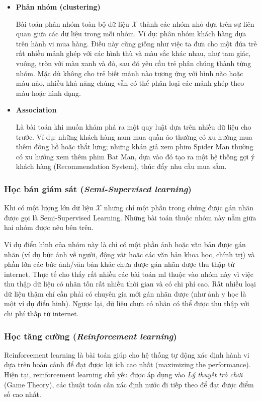 \documentclass[../main-report.tex]{subfiles}
\begin{document}
\begin{itemize}
\item \textbf{Phân nhóm (clustering)}

Bài toán phân nhóm toàn bộ dữ liệu \(\mathcal{X}\) thành các nhóm nhỏ dựa trên sự liên quan giữa các dữ liệu trong mỗi nhóm. Ví dụ: phân nhóm khách hàng dựa trên hành vi mua hàng. Điều này cũng giống như việc ta đưa cho một đứa trẻ rất nhiều mảnh ghép với các hình thù và màu sắc khác nhau, như tam giác, vuông, tròn với màu xanh và đỏ, sau đó yêu cầu trẻ phân chúng thành từng nhóm. Mặc dù không cho trẻ biết mảnh nào tương ứng với hình nào hoặc màu nào, nhiều khả năng chúng vẫn có thể phân loại các mảnh ghép theo màu hoặc hình dạng.

\item \textbf{Association}

Là bài toán khi muốn khám phá ra một quy luật dựa trên nhiều dữ liệu cho trước. Ví dụ: những khách hàng nam mua quần áo thường có xu hướng mua thêm đồng hồ hoặc thắt lưng; những khán giả xem phim Spider Man thường có xu hướng xem thêm phim Bat Man, dựa vào đó tạo ra một hệ thống gợi ý khách hàng (Recommendation System), thúc đẩy nhu cầu mua sắm.
\end{itemize}

\subsubsection{Học bán giám sát (\emph{Semi-Supervised learning})}
Khi có một lượng lớn dữ liệu \(\mathcal{X}\) nhưng chỉ một phần trong chúng được gán nhãn được gọi là Semi-Supervised Learning. Những bài toán thuộc nhóm này nằm giữa hai nhóm được nêu bên trên.

Ví dụ điển hình của nhóm này là chỉ có một phần ảnh hoặc văn bản được gán nhãn (ví dụ bức ảnh về người, động vật hoặc các văn bản khoa học, chính trị) và phần lớn các bức ảnh/văn bản khác chưa được gán nhãn được thu thập từ internet. Thực tế cho thấy rất nhiều các bài toán \gls{ml} thuộc vào nhóm này vì việc thu thập dữ liệu có nhãn tốn rất nhiều thời gian và có chi phí cao. Rất nhiều loại dữ liệu thậm chí cần phải có chuyên gia mới gán nhãn được (như ảnh y học là một ví dụ điển hinh). Ngược lại, dữ liệu chưa có nhãn có thể được thu thập với chi phí thấp từ internet.

\subsubsection{Học tăng cường (\emph{Reinforcement learning})}
Reinforcement learning là bài toán giúp cho hệ thống tự động xác định hành vi dựa trên hoàn cảnh để đạt được lợi ích cao nhất (maximizing the performance). Hiện tại, reinforcement learning chủ yếu được áp dụng vào \emph{Lý thuyết trò chơi} (Game Theory), các thuật toán cần xác định nước đi tiếp theo để đạt được điểm số cao nhất.
\end{document}

